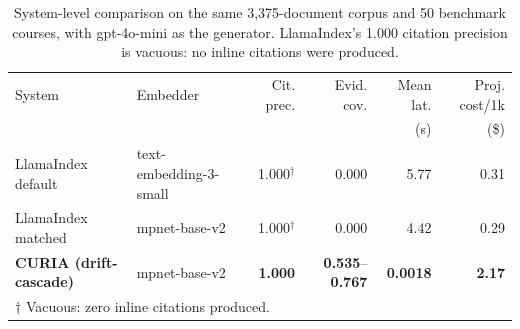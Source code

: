\begin{table}[t]
\centering
\caption{System-level comparison on the same 3,375-document corpus and 50 benchmark courses, with gpt-4o-mini as the generator. LlamaIndex's 1.000 citation precision is vacuous: no inline citations were produced.}
\label{tab:llamaindex-vs-curia}
\footnotesize
\begin{tabular}{llrrrr}
\hline
System & Embedder & Cit. prec. & Evid. cov. & Mean lat. & Proj. cost/1k \\
 & & & & (s) & (\$) \\
\hline
LlamaIndex default & text-embedding-3-small & 1.000$^{\dagger}$ & 0.000 & 5.77 & 0.31 \\
LlamaIndex matched & mpnet-base-v2 & 1.000$^{\dagger}$ & 0.000 & 4.42 & 0.29 \\
\textbf{CURIA (drift-cascade)} & mpnet-base-v2 & \textbf{1.000} & \textbf{0.535}--\textbf{0.767} & \textbf{0.0018} & \textbf{2.17} \\
\hline
\multicolumn{6}{l}{\footnotesize $\dagger$ Vacuous: zero inline citations produced.} \\
\end{tabular}
\end{table}
